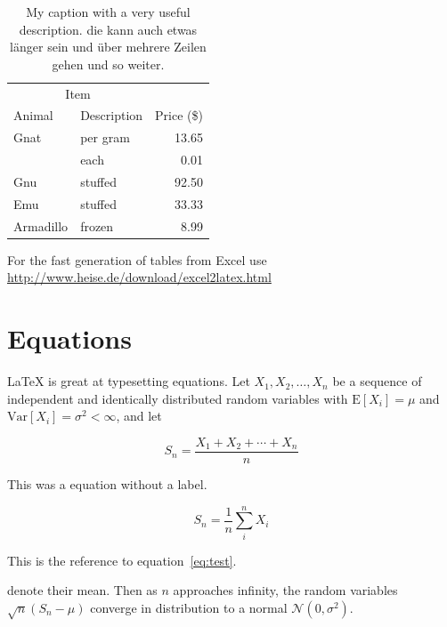 \begin{table}[ht!]
  \caption{My caption with a very useful description. die kann auch etwas länger sein und über mehrere Zeilen gehen und so weiter.}
  \label{my-label}
  \begin{tabular}{llr}
    \hline
    \multicolumn{2}{c}{Item} &            \\ \cline{1-2}
    Animal     & Description & Price (\$) \\ \hline
    Gnat       & per gram    & 13.65      \\
               & each        & 0.01       \\
    Gnu        & stuffed     & 92.50      \\
    Emu        & stuffed     & 33.33      \\
    Armadillo  & frozen      & 8.99       \\ \hline
  \end{tabular}
\end{table}

For the fast generation of tables from Excel use \url{http://www.heise.de/download/excel2latex.html}

\section{Equations}

\LaTeX{} is great at typesetting equations. Let $X_1, X_2, \ldots, X_n$ be a sequence of independent and identically distributed random variables with $\text{E}[X_i] = \mu$ and $\text{Var}[X_i] = \sigma^2 < \infty$, and let

$$S_n = \frac{X_1 + X_2 + \cdots + X_n}{n}$$

This was a equation without a label.
      
\begin{equation}
S_n = \frac{1}{n}\sum_{i}^{n} X_i
\label{eq:test}
\end{equation}

This is the reference to equation~\ref{eq:test}.      

denote their mean. Then as $n$ approaches infinity, the random variables $\sqrt{n}(S_n - \mu)$ converge in distribution to a normal $\mathcal{N}(0, \sigma^2)$.


